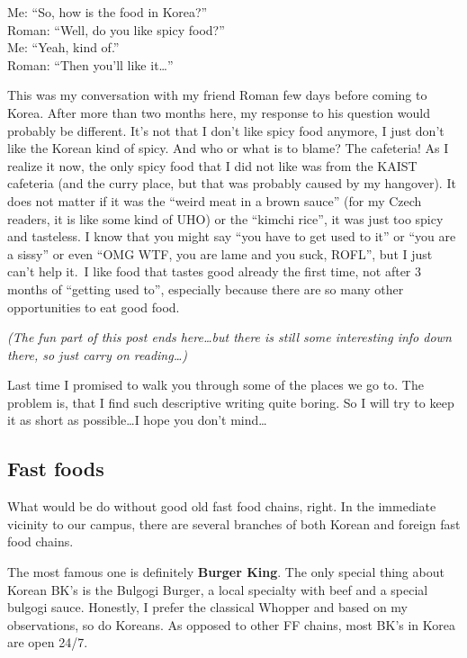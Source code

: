 \begin{post}
	\begin{content}
\begin{blockquote}Me: ``So, how is the food in Korea?''\\
Roman: ``Well, do you like spicy food?''\\
Me: ``Yeah, kind of.''\\
Roman: ``Then you'll like it{\ldots}''\end{blockquote}

This was my conversation with my friend Roman few days before coming to Korea. After more than two months here, my response to his question would probably be different. It's not that I don't like spicy food anymore, I just don't like the Korean kind of spicy. And who or what is to blame? The cafeteria! As I realize it now, the only spicy food that I did not like was from the KAIST cafeteria (and the curry place, but that was probably caused by my hangover). It does not matter if it was the ``weird meat in a brown sauce'' (for my Czech readers, it is like some kind of UHO) or the ``kimchi rice'', it was just too spicy and tasteless. I know that you might say ``you have to get used to it'' or ``you are a sissy'' or even ``OMG WTF, you are lame and you suck, ROFL'', but I just can't help it. I like food that tastes good already the first time, not after 3 months of ``getting used to'', especially because there are so many other opportunities to eat good food.

\textit{(The fun part of this post ends here{\ldots}but there is still some interesting info down there, so just carry on reading{\ldots})}

Last time I promised to walk you through some of the places we go to. The problem is, that I find such descriptive writing quite boring. So I will try to keep it as short as possible{\ldots}I hope you don't mind\ldots

\subsection{Fast foods}
What would be do without good old fast food chains, right. In the immediate vicinity to our campus, there are several branches of both Korean and foreign fast food chains.

The most famous one is definitely \textbf{Burger King}. The only special thing about Korean BK's is the Bulgogi Burger, a local specialty with beef and a special bulgogi sauce. Honestly, I prefer the classical Whopper and based on my observations, so do Koreans. As opposed to other FF chains, most BK's in Korea are open 24/7.


\end{content}
\end{post}
